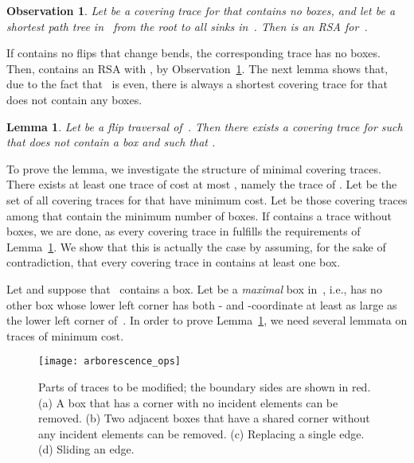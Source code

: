 \documentclass[a4paper,11pt]{article}
\newtheorem{lemma}[theorem]{Lemma}
\newtheorem{observation}[theorem]{Observation}
\newcommand{\noproof}{~\hfill}
\begin{document}
\begin{observation}\label{obs_arborescence_in_trace}
Let  be a covering trace for  that contains no boxes, and
let  be a shortest path tree in~ from the root to
all sinks in~.
Then   is an RSA for~.\noproof
\end{observation}

If  contains no flips that change bends, the corresponding trace  has no boxes. 
Then,  contains an RSA  with , by Observation~\ref{obs_arborescence_in_trace}.
The next lemma shows that, due to the fact that~ is even, there is always a shortest covering trace for  that does not contain any boxes.

\begin{lemma}\label{lem:eliminate_chain_phase}
Let  be a flip traversal of~.
Then there exists a covering trace  for  
such that  does not contain a box and such that .
\end{lemma}
To prove the lemma, we investigate the structure of minimal covering traces.
There exists at least one trace of cost at most , namely the trace of .
Let  be the set of all covering traces for  that have minimum cost.
Let  be those covering traces among  that contain the  minimum number of boxes.
If  contains a trace without boxes, we are done, as every covering trace in  fulfills the requirements of Lemma~\ref{lem:eliminate_chain_phase}.
We show that this is actually the case by assuming, for the sake of contradiction, that every covering trace in  contains at least one box.

Let   and suppose that~ contains a box.
Let  be a \emph{maximal} box in~, i.e.,  has no other box whose lower left corner has 
both - and -coordinate at least as large as the lower left corner of~.
In order to prove Lemma~\ref{lem:eliminate_chain_phase}, we need several lemmata on traces of minimum cost.

\begin{figure}
\begin{center}
\texttt{[image: arborescence\_ops]}
\end{center}
\caption{
Parts of traces to be modified; the boundary sides are shown in red.
(a) A box that has a corner  with no incident elements can be removed.
(b) Two adjacent boxes that have a shared corner  without any incident elements can be removed.
(c) Replacing a single edge.
(d) Sliding an edge.
}
\label{fig:tree_operations}
\end{figure}
\end{document}
